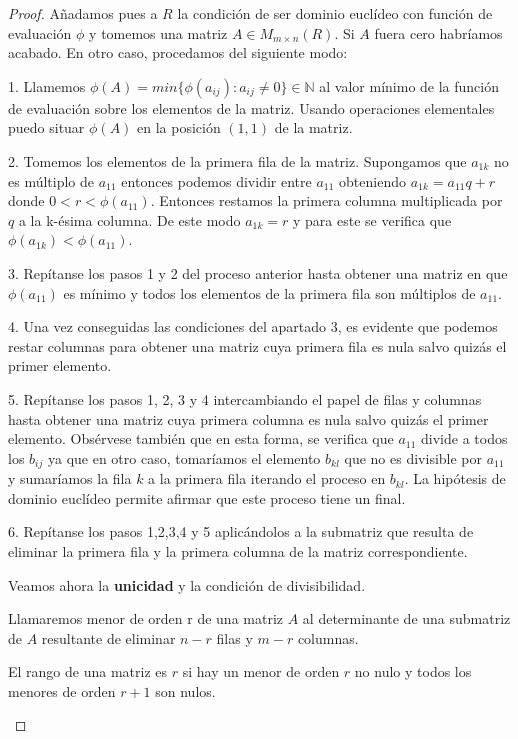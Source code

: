 \begin{proof}
Añadamos pues a $R$ la condición de ser dominio euclídeo con función de evaluación $\phi$ y tomemos una matriz $A \in M_{m \times n}(R)$. Si $A$ fuera cero habríamos acabado. En otro caso, procedamos del siguiente modo:

1. Llamemos $\phi(A) = min\{\phi(a_{ij}):a_{ij} \neq 0\} \in \mathbb{N}$ al valor mínimo de la función de evaluación sobre los elementos de la matriz. Usando operaciones elementales puedo situar $\phi(A)$ en la posición $(1,1)$ de la matriz. 

2. Tomemos los elementos de la primera fila de la matriz. Supongamos que $a_{1k}$ no es múltiplo de $a_11$ entonces podemos dividir entre $a_11$ obteniendo $a_{1k} = a_{11}q + r$ donde $0 < r < \phi(a_11)$. Entonces restamos la primera columna multiplicada por $q$ a la k-ésima columna. De este modo $a_{1k} = r$ y para este se verifica que $\phi(a_{1k}) < \phi(a_{11})$. 

3. Repítanse los pasos 1 y 2 del proceso anterior hasta obtener una matriz en que $\phi(a_{11})$ es mínimo y todos los elementos de la primera fila son múltiplos de $a_11$. 

4. Una vez conseguidas las condiciones del apartado 3, es evidente que podemos restar columnas para obtener una matriz cuya primera fila es nula salvo quizás el primer elemento. 

5. Repítanse los pasos 1, 2, 3 y 4 intercambiando el papel de filas y columnas hasta obtener una matriz cuya primera columna es nula salvo quizás el primer elemento. Obsérvese también que en esta forma, se verifica que $a_{11}$ divide a todos los $b_{ij}$ ya que en otro caso, tomaríamos el elemento $b_{kl}$ que no es divisible por $a_11$ y sumaríamos la fila $k$ a la primera fila iterando el proceso en $b_{kl}$. La hipótesis de dominio euclídeo permite afirmar que este proceso tiene un final.

6. Repítanse los pasos 1,2,3,4 y 5 aplicándolos a la submatriz que resulta de eliminar la primera fila y la primera columna de la matriz correspondiente.

Veamos ahora la \textbf{unicidad} y la condición de divisibilidad. 

\begin{definition}
Llamaremos menor de orden r de una matriz $A$ al determinante de una submatriz de $A$ resultante de eliminar $n-r$ filas y $m-r$ columnas.
\end{definition}

\begin{definition}
El rango de una matriz es $r$ si hay un menor de orden $r$ no nulo y todos los menores de orden $r+1$ son nulos. 
\end{definition}


\end{proof}
